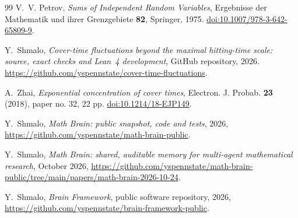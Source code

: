\documentclass[11pt]{amsart}
\theoremstyle{remark}
\numberwithin{equation}{section}
\begin{document}
\begin{thebibliography}{99}
V.~V. Petrov, \emph{Sums of Independent Random Variables}, Ergebnisse der Mathematik und ihrer Grenzgebiete \textbf{82}, Springer, 1975.
\href{https://doi.org/10.1007/978-3-642-65809-9}{doi:10.1007/978-3-642-65809-9}.

Y.~Shmalo, \emph{Cover-time fluctuations beyond the maximal hitting-time scale: source, exact checks and Lean~4 development}, GitHub repository, 2026.
\url{https://github.com/yspennstate/cover-time-fluctuations}.

A.~Zhai, \emph{Exponential concentration of cover times}, Electron. J. Probab. \textbf{23} (2018), paper no. 32, 22 pp.
\href{https://doi.org/10.1214/18-EJP149}{doi:10.1214/18-EJP149}.

 Y.~Shmalo, \emph{Math Brain: public snapshot, code and tests}, 2026, \url{https://github.com/yspennstate/math-brain-public}.

 Y.~Shmalo, \emph{Math Brain: shared, auditable memory for multi-agent mathematical research}, October 2026, \url{https://github.com/yspennstate/math-brain-public/tree/main/papers/math-brain-2026-10-24}.

 Y.~Shmalo, \emph{Brain Framework}, public software repository, 2026, \url{https://github.com/yspennstate/brain-framework-public}.

\end{thebibliography}
\end{document}
